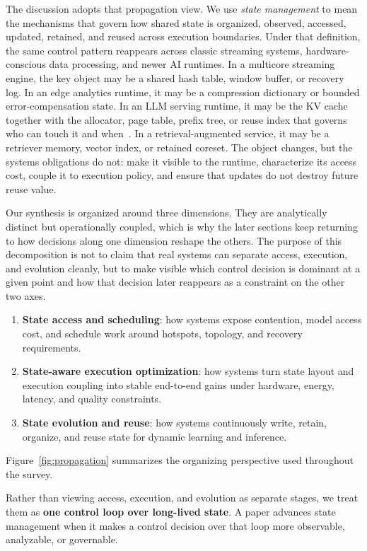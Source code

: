 \documentclass[acmsmall,screen,review]{acmart}
\newenvironment{quotebox}{%
  \vspace{4pt}\noindent
  \begin{lrbox}{\quoteboxcontent}
  \begin{minipage}{\dimexpr\linewidth-2\fboxsep-2\fboxrule-14pt\relax}
  \raggedright\small\itshape
  \hspace{6pt}%
}{%
  \end{minipage}
  \end{lrbox}
  \setlength{\fboxrule}{0.8pt}%
  \fcolorbox{quoteborder}{white}{\usebox{\quoteboxcontent}}%
  \vspace{4pt}%
}
\begin{document}
The discussion adopts that propagation view. We use \emph{state management} to mean the mechanisms that govern how shared state is organized, observed, accessed, updated, retained, and reused across execution boundaries. Under that definition, the same control pattern reappears across classic streaming systems, hardware-conscious data processing, and newer AI runtimes. In a multicore streaming engine, the key object may be a shared hash table, window buffer, or recovery log. In an edge analytics runtime, it may be a compression dictionary or bounded error-compensation state. In an LLM serving runtime, it may be the KV cache together with the allocator, page table, prefix tree, or reuse index that governs who can touch it and when~\cite{kwon2023pagedattention,zheng2023sglang}. In a retrieval-augmented service, it may be a retriever memory, vector index, or retained coreset. The object changes, but the systems obligations do not: make it visible to the runtime, characterize its access cost, couple it to execution policy, and ensure that updates do not destroy future reuse value.

Our synthesis is organized around three dimensions. They are analytically distinct but operationally coupled, which is why the later sections keep returning to how decisions along one dimension reshape the others. The purpose of this decomposition is not to claim that real systems can separate access, execution, and evolution cleanly, but to make visible which control decision is dominant at a given point and how that decision later reappears as a constraint on the other two axes.

\begin{enumerate}[leftmargin=*]
\item \textbf{State access and scheduling}: how systems expose contention, model access cost, and schedule work around hotspots, topology, and recovery requirements.
\item \textbf{State-aware execution optimization}: how systems turn state layout and execution coupling into stable end-to-end gains under hardware, energy, latency, and quality constraints.
\item \textbf{State evolution and reuse}: how systems continuously write, retain, organize, and reuse state for dynamic learning and inference.
\end{enumerate}
Figure~\ref{fig:propagation} summarizes the organizing perspective used throughout the survey.

\begin{quotebox}
Rather than viewing access, execution, and evolution as separate stages, we treat them as \textbf{one control loop over long-lived state}. A paper advances state management when it makes a control decision over that loop more observable, analyzable, or governable.
\end{quotebox}
\end{document}
